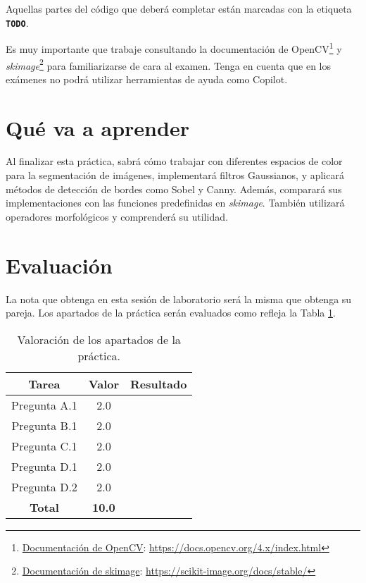 Aquellas partes del código que deberá completar están marcadas con la etiqueta \textbf{\texttt{TODO}}.

Es muy importante que trabaje consultando la documentación de OpenCV\footnote{\href{https://docs.opencv.org/4.x/index.html}{Documentación de OpenCV}: \url{https://docs.opencv.org/4.x/index.html}} y \textit{skimage}\footnote{\href{https://scikit-image.org/docs/stable/}{Documentación de skimage}: \url{https://scikit-image.org/docs/stable/}} para familiarizarse de cara al examen. Tenga en cuenta que en los exámenes no podrá utilizar herramientas de ayuda como Copilot.

\section{Qué va a aprender}

Al finalizar esta práctica, sabrá cómo trabajar con diferentes espacios de color para la segmentación de imágenes, implementará filtros Gaussianos, y aplicará métodos de detección de bordes como Sobel y Canny. Además, comparará sus implementaciones con las funciones predefinidas en \textit{skimage}. También utilizará operadores morfológicos y comprenderá su utilidad.

\section{Evaluación}

La nota que obtenga en esta sesión de laboratorio será la misma que obtenga su pareja. Los apartados de la práctica serán evaluados como refleja la Tabla \ref{table:evaluacion}.

\begin{table}[h!]
    \centering
    \begin{tabular}{|c|c|c|}
    \hline
    \textbf{Tarea} & \textbf{Valor} & \textbf{Resultado} \\
    \hline
    Pregunta A.1 & 2.0 & \\
    \hline
    Pregunta B.1 & 2.0 & \\
    \hline
    Pregunta C.1 & 2.0 & \\
    \hline
    Pregunta D.1 & 2.0 & \\
    \hline
    Pregunta D.2 & 2.0 & \\
    \hline
    \textbf{Total} & \textbf{10.0} & \\
    \hline
    \end{tabular}
    \caption{Valoración de los apartados de la práctica.}
    \label{table:evaluacion}
\end{table}
